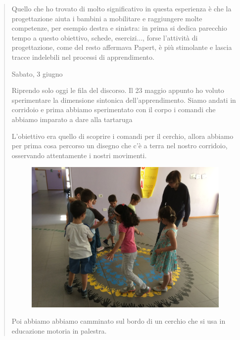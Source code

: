 \begin{quote}
Quello che ho trovato di molto significativo in questa esperienza è che la progettazione aiuta i bambini a mobilitare e raggiungere molte competenze, per esempio destra e sinistra: in prima si dedica parecchio tempo a questo obiettivo, schede, esercizi..., forse l'attività di progettazione, come del resto affermava Papert, è più stimolante e lascia tracce indelebili nel processi di apprendimento. 

Sabato, 3 giugno

Riprendo solo oggi le fila del discorso. Il 23 maggio appunto ho voluto sperimentare la dimensione sintonica dell'apprendimento. Siamo andati in corridoio e prima abbiamo sperimentato con il corpo i comandi che abbiamo imparato a dare alla tartaruga

L'obiettivo era quello di scoprire i comandi per il cerchio, allora abbiamo per prima cosa percorso un disegno che c'è a terra nel nostro corridoio, osservando attentamente i nostri movimenti.

\begin{figure}[H]
   \centering
   \includegraphics[width=10.0cm,trim=4 4 6 4,clip]{./images/cerchio/PiccolomanualeLibreLogo5-img5.jpg}
   \label{cer-6}
\end{figure}

Poi abbiamo abbiamo camminato sul bordo di un cerchio che si usa in educazione motoria in palestra.



\end{quote}

